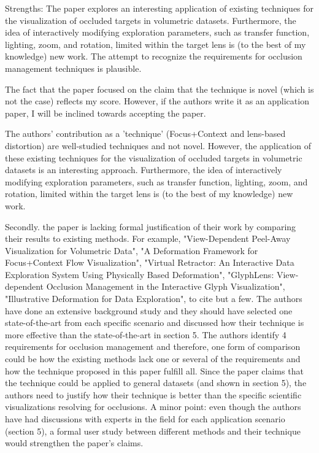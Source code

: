 \documentclass[a4paper,10pt]{article}
\begin{document}
    Strengths:
    The paper explores an interesting application of existing techniques for the
    visualization of occluded targets in volumetric datasets. Furthermore, the idea of
    interactively modifying exploration parameters, such as transfer function,
    lighting, zoom, and rotation, limited within the target lens is (to the best of my
    knowledge) new work. The attempt to recognize the requirements for occlusion
    management techniques is plausible.

    The fact that the paper focused on the claim that the technique is novel (which is
    not the case) reflects my score. However, if the authors write it as an
    application paper, I will be inclined towards accepting the paper.

    The authors' contribution as a 'technique' (Focus+Context and lens-based
    distortion) are well-studied techniques and not novel. However, the application of
    these existing techniques for the visualization of occluded targets in volumetric
    datasets is an interesting approach. Furthermore, the idea of interactively
    modifying exploration parameters, such as transfer function, lighting, zoom, and
    rotation, limited within the target lens is (to the best of my knowledge) new
    work.

    Secondly. the paper is lacking formal justification of their work by comparing
    their results to existing methods. For example, "View-Dependent Peel-Away
    Visualization for Volumetric Data", "A Deformation Framework for Focus+Context
    Flow Visualization", "Virtual Retractor: An Interactive Data Exploration System
    Using Physically Based Deformation", "GlyphLens: View-dependent Occlusion
    Management in the Interactive Glyph Visualization", "Illustrative Deformation for
    Data Exploration", to cite but a few. The authors have done an extensive
    background study and they should have selected one state-of-the-art from each
    specific scenario and discussed how their technique is more effective than the
    state-of-the-art in section 5. The authors identify 4 requirements for occlusion
    management and therefore, one form of comparison could be how the existing methods
    lack one or several of the requirements and how the technique proposed in this
    paper fulfill all. Since the paper claims that the technique could be applied to
    general datasets (and shown in section 5), the authors need to justify how their
    technique is better than the specific scientific visualizations resolving for
    occlusions.
    A minor point: even though the authors have had discussions with experts in the
    field for each application scenario (section 5), a formal user study between
    different methods and their technique would strengthen the paper's claims.
\end{document}
